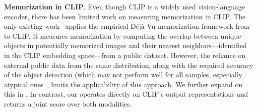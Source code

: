 \textbf{Memorization in CLIP}.
Even though CLIP is a widely used vision-language encoder, there has been limited work on measuring memorization in CLIP.
The only existing work~\citep{jayaraman2024} applies the empirical Déjà Vu memorization framework from~\citep{meehan2023ssl} to CLIP. It measures memorization by computing the overlap between unique objects in potentially memorized images and their nearest neighbors---identified in the CLIP embedding space---from a public dataset.
However, the reliance on external public data from the same distribution, along with the required accuracy of the object detection (which may not perform well for all samples, especially atypical ones~\citep{kumar2023normalizing,dhamija2020overlooked}, limits the applicability of this approach. We further expand on this in .
In contrast, our \ours operates directly on CLIP's output representations and returns a joint score over both modalities. 

